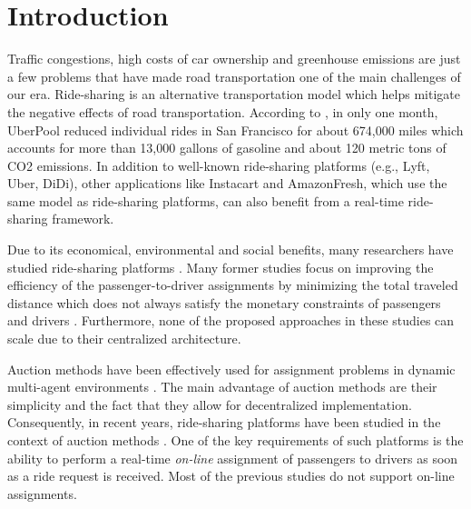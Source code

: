\section{Introduction}
\label{sec:intro}

Traffic congestions, high costs of car ownership and greenhouse emissions are just a few problems that have made road transportation one of the main challenges of our era. Ride-sharing is an alternative transportation model which helps mitigate the negative effects of road transportation. According to \cite{Uber15}, in only one month, UberPool reduced individual rides in San Francisco for about 674,000 miles which accounts for more than 13,000 gallons of gasoline and about 120 metric tons of CO2 emissions. In addition to well-known ride-sharing platforms (e.g., Lyft, Uber, DiDi), other applications like Instacart and AmazonFresh, which use the same model as ride-sharing platforms, can also benefit from a real-time ride-sharing framework.

Due to its economical, environmental and social benefits, many researchers have studied ride-sharing platforms \cite{Kamar09,Kleiner11,Huang14,Cheng14,Ma15,Cici15,Shen16}. Many former studies \cite{Huang14,Ma15,Cici15} focus on improving the efficiency of the passenger-to-driver assignments by minimizing the total traveled distance which does not always satisfy the monetary constraints of passengers and drivers \cite{Asghari16}. Furthermore, none of the proposed approaches in these studies can scale due to their centralized architecture.

Auction methods have been effectively used for assignment problems in dynamic multi-agent environments \cite{Lagoudakis04,Mehta05}. The main advantage of auction methods are their simplicity and the fact that they allow for decentralized implementation. Consequently, in recent years, ride-sharing platforms have been studied in the context of auction methods \cite{Kamar09,Cheng14,Shen16}. One of the key requirements of such platforms is the ability to perform a real-time \emph{on-line} assignment of passengers to drivers as soon as a ride request is received. Most of the previous studies do not support on-line assignments\cite{Kamar09,Kleiner11,Cheng14}.

